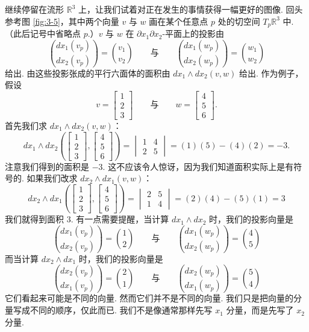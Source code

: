继续停留在流形 $\mathbb{R}^3$ 上，让我们试着对正在发生的事情获得一幅更好的图像. 回头参考图 \ref{fig:3-5}，其中两个向量 $v$ 与 $w$ 画在某个任意点 $p$ 处的切空间 $T_p\mathbb{R}^3$ 中. （此后记号中省略点 $p$.）$v$ 与 $w$ 在 $\partial x_1\partial x_2$-平面上的投影由
\[
\binom{dx_1(v_p)}{dx_2(v_p)}=\binom{v_1}{v_2}\qquad\text{与}\qquad\binom{dx_1(w_p)}{dx_2(w_p)}=\binom{w_1}{w_2}
\]
给出. 由这些投影张成的平行六面体的面积由 $dx_1\wedge dx_2(v,w)$ 给出. 作为例子，假设
\[
v=\begin{bmatrix}1\\2\\3\end{bmatrix}\qquad\text{与}\qquad w=\begin{bmatrix}4\\5\\6\end{bmatrix}.
\]
首先我们求 $dx_1\wedge dx_2(v,w)$：
\[
dx_1\wedge dx_2\left(\begin{bmatrix}1\\2\\3\end{bmatrix},\begin{bmatrix}4\\5\\6\end{bmatrix}\right)
=\begin{vmatrix}1&4\\2&5\end{vmatrix}=(1)(5)-(4)(2)=-3.
\]
注意我们得到的面积是 $-3$. 这不应该令人惊讶，因为我们知道面积实际上是有符号的. 如果我们改求 $dx_2\wedge dx_1(v,w)$：
\[
dx_2\wedge dx_1\left(\begin{bmatrix}1\\2\\3\end{bmatrix},\begin{bmatrix}4\\5\\6\end{bmatrix}\right)
=\begin{vmatrix}2&5\\1&4\end{vmatrix}=(2)(4)-(5)(1)=3
\]
我们就得到面积 3. 有一点需要提醒，当计算 $dx_1\wedge dx_2$ 时，我们的投影向量是
\[
\binom{dx_1(v_p)}{dx_2(v_p)}=\binom{1}{2}\qquad\text{与}\qquad\binom{dx_1(w_p)}{dx_2(w_p)}=\binom{4}{5}
\]
而当计算 $dx_2\wedge dx_1$ 时，我们的投影向量是
\[
\binom{dx_2(v_p)}{dx_1(v_p)}=\binom{2}{1}\qquad\text{与}\qquad\binom{dx_2(w_p)}{dx_1(w_p)}=\binom{5}{4}
\]
它们看起来可能是不同的向量. 然而它们并不是不同的向量. 我们只是把向量的分量写成不同的顺序，仅此而已. 我们不是像通常那样先写 $x_1$ 分量，而是先写了 $x_2$ 分量.

